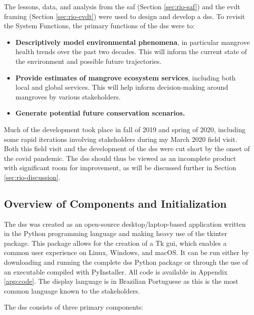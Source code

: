 The lessons, data, and analysis from the \ac{saf} (Section \ref{sec:rio-saf}) and the \ac{evdt} framing (Section \ref{sec:rio-evdt}) were used to design and develop a \acf{dss}. To revisit the System Functions, the primary functions of the \ac{dss} were to:

\begin{itemize}[itemsep=0pt,parsep=0pt]
    \item{\textbf{Descriptively model environmental phenomena}, in particular mangrove health trends over the past two decades. This will inform the current state of the environment and possible future trajectories.}
    \item{\textbf{Provide estimates of mangrove ecosystem services}, including both local and global services. This will help inform decision-making around mangroves by various stakeholders.}
    \item{\textbf{Generate potential future conservation scenarios.}}
\end{itemize}

Much of the development took place in fall of 2019 and spring of 2020, including some rapid iterations involving stakeholders during my March 2020 field visit. Both this field visit and the development of the \ac{dss} were cut short by the onset of the \ac{covid} pandemic. The \ac{dss} should thus be viewed as an incomplete product with significant room for improvement, as will be discussed further in Section \ref{sec:rio-discussion}.

\subsection{Overview of Components and Initialization}

The \ac{dss} was created as an open-source desktop/laptop-based application written in the Python programming language and making heavy use of the tkinter package. This package allows for the creation of a Tk \ac{gui}, which enables a common user experience on Linux, Windows, and macOS. It can be run either by downloading and running the complete \ac{dss} Python package or through the use of an executable compiled with PyInstaller. All code is available in Appendix \ref{app:code}. The display language is in Brazilian Portuguese as this is the most common language known to the stakeholders.

The \ac{dss} consists of three primary components:

